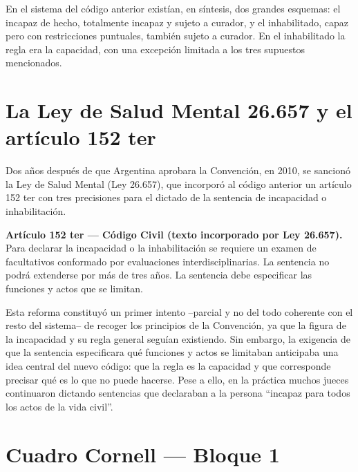\documentclass[12pt,oneside]{book}
\begin{document}
\begin{note}
En el sistema del código anterior existían, en síntesis, dos grandes esquemas: el incapaz de hecho, totalmente incapaz y sujeto a curador, y el inhabilitado, capaz pero con restricciones puntuales, también sujeto a curador. En el inhabilitado la regla era la capacidad, con una excepción limitada a los tres supuestos mencionados.
\end{note}

\section{La Ley de Salud Mental 26.657 y el artículo 152 ter}

Dos años después de que Argentina aprobara la Convención, en 2010, se sancionó la Ley de Salud Mental (Ley 26.657), que incorporó al código anterior un artículo 152 ter con tres precisiones para el dictado de la sentencia de incapacidad o inhabilitación.

\begin{important}
\textbf{Artículo 152 ter --- Código Civil (texto incorporado por Ley 26.657).} Para declarar la incapacidad o la inhabilitación se requiere un examen de facultativos conformado por evaluaciones interdisciplinarias. La sentencia no podrá extenderse por más de tres años. La sentencia debe especificar las funciones y actos que se limitan.
\end{important}

Esta reforma constituyó un primer intento --parcial y no del todo coherente con el resto del sistema-- de recoger los principios de la Convención, ya que la figura de la incapacidad y su regla general seguían existiendo. Sin embargo, la exigencia de que la sentencia especificara qué funciones y actos se limitaban anticipaba una idea central del nuevo código: que la regla es la capacidad y que corresponde precisar qué es lo que no puede hacerse. Pese a ello, en la práctica muchos jueces continuaron dictando sentencias que declaraban a la persona ``incapaz para todos los actos de la vida civil''.

\section{Cuadro Cornell --- Bloque 1}
\end{document}
